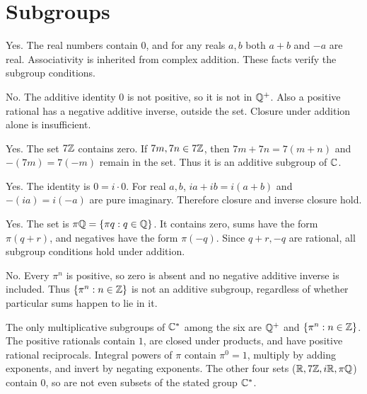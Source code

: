 \section{Subgroups}


Yes. The real numbers contain $0$, and for any reals $a,b$ both $a+b$ and $-a$ are real. Associativity is inherited from complex addition. These facts verify the subgroup conditions.


No. The additive identity $0$ is not positive, so it is not in $\mathbb{Q}^+$. Also a positive rational has a negative additive inverse, outside the set. Closure under addition alone is insufficient.


Yes. The set $7\mathbb{Z}$ contains zero. If $7m,7n\in7\mathbb{Z}$, then $7m+7n=7(m+n)$ and $-(7m)=7(-m)$ remain in the set. Thus it is an additive subgroup of $\mathbb{C}$.


Yes. The identity is $0=i\cdot0$. For real $a,b$, $ia+ib=i(a+b)$ and $-(ia)=i(-a)$ are pure imaginary. Therefore closure and inverse closure hold.


Yes. The set is $\pi\mathbb{Q}=\{\pi q:q\in\mathbb{Q}\}$. It contains zero, sums have the form $\pi(q+r)$, and negatives have the form $\pi(-q)$. Since $q+r,-q$ are rational, all subgroup conditions hold under addition.


No. Every $\pi^n$ is positive, so zero is absent and no negative additive inverse is included. Thus $\{\pi^n:n\in\mathbb{Z}\}$ is not an additive subgroup, regardless of whether particular sums happen to lie in it.


The only multiplicative subgroups of $\mathbb{C}^*$ among the six are $\mathbb{Q}^+$ and $\{\pi^n:n\in\mathbb{Z}\}$. The positive rationals contain $1$, are closed under products, and have positive rational reciprocals. Integral powers of $\pi$ contain $\pi^0=1$, multiply by adding exponents, and invert by negating exponents. The other four sets ($\mathbb{R},7\mathbb{Z},i\mathbb{R},\pi\mathbb{Q}$) contain $0$, so are not even subsets of the stated group $\mathbb{C}^*$.

